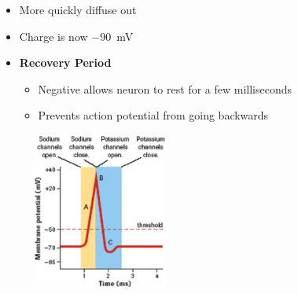 \documentclass[a4paper,12pt]{article}
\begin{document}
\begin{enumerate}
{\begin{figure}[H]
            \end{figure}
            \begin{itemize}
                \item{More  quickly diffuse out}
                \item{Charge is now \SI{-90}{\mV}}
                \item{
                        \textbf{Recovery Period}
                        \begin{itemize}
                            \item{Negative allows neuron to rest for a few milliseconds}
                            \item{Prevents action potential from going backwards}
                        \end{itemize}
                    }
            \end{itemize}
        }
\end{enumerate}
\begin{figure}[H]
    \centering
    \includegraphics[width=0.40\textwidth]{ngraph2}
\end{figure}
\end{document}
